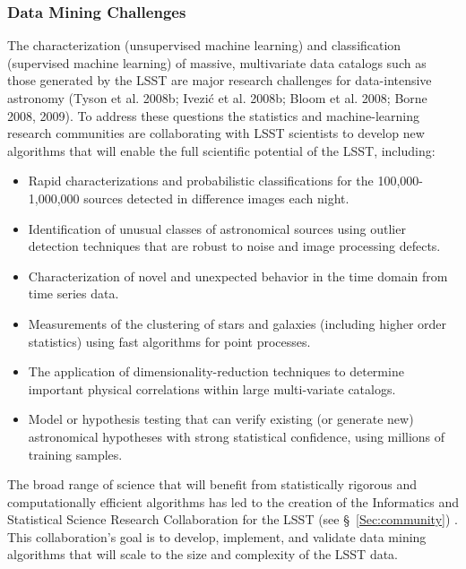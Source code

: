 \documentclass{emulateapj}
\newcommand{\B}[1]{{#1}}
\begin{document}
\B{
\subsubsection{Data Mining Challenges}

The characterization (unsupervised machine learning) and classification (supervised machine learning) of 
massive, multivariate data catalogs such as those generated by the LSST are major research challenges for 
data-intensive astronomy (Tyson et al. 2008b; Ivezi\'{c} et al. 2008b; Bloom et al. 2008; Borne 2008,
2009). To address these questions the statistics and machine-learning research 
communities are collaborating with LSST scientists to develop new algorithms that will enable the full 
scientific potential of the LSST, including:
\begin{itemize}
\item Rapid characterizations and probabilistic classifications for the 100,000-1,000,000 sources
          detected in difference images each night.
\item Identification of unusual classes of astronomical sources using outlier detection techniques that are 
          robust to noise and image processing defects.
\item Characterization of novel and unexpected behavior in the time domain from time series data.
\item Measurements of the clustering of stars and galaxies (including higher order statistics) using fast 
          algorithms for point processes.
\item The application of dimensionality-reduction techniques to determine important physical correlations 
          within large multi-variate catalogs.
\item Model or hypothesis testing that can verify existing (or generate new) astronomical hypotheses with 
          strong statistical confidence, using millions of training samples.
\end{itemize}

The broad range of science that will benefit from statistically rigorous and computationally efficient algorithms 
has led to the creation of the Informatics and Statistical Science Research Collaboration for the LSST
 (see \S~\ref{Sec:community}) . This 
collaboration's goal is to develop, implement, and validate data mining algorithms that will scale to the size and 
complexity of the LSST data. 
}
\end{document}
